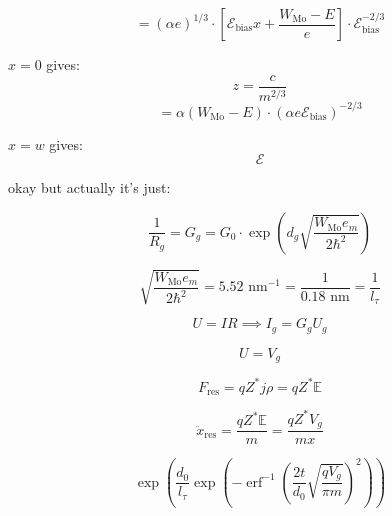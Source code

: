 \documentclass{article}
\DeclareMathOperator\erf{erf}
\begin{document}
\[=\left(\alpha e\right)^{1/3}\cdot\left[\mathcal{E}_{\text{bias}}x+\frac{W_{\text{Mo}}-E}{e}\right]
\cdot\mathcal{E}_{\text{bias}}^{-2/3}\]

$x=0$ gives:
\[z=\frac{c}{m^{2/3}}\]
\[=\alpha(W_{\text{Mo}}-E)\cdot\left(\alpha e\mathcal{E}_{\text{bias}}\right)^{-2/3}\]

$x=w$ gives:
\[\mathcal{E}\]

okay but actually it's just:




\[
\frac{1}{R_g} = G_g = G_0 \cdot \exp \left(d_g\sqrt{\frac{W_{\text{Mo}} e_m}{2\hbar^2}} \right)
\]

\[
\sqrt{\frac{W_{\text{Mo}} e_m}{2\hbar^2}} = 5.52\text{ nm}^{-1} = \frac{1}{0.18 \text{ nm} } = \frac{1}{l_\tau}
\]

\[
U=IR\implies I_g=G_gU_g
\]

\[
U=V_g
\]

\[
F_\text{res}=qZ^*j\rho=qZ^*\mathbb{E}
\]

\[
\ddot{x}_\text{res}=\frac{qZ^*\mathbb{E}}{m}=\frac{qZ^*V_g}{mx}
\]

\[
\exp\left(\frac{d_0}{l_\tau}\exp\left(-\erf^{-1}\left(
\frac{2t}{d_0}\sqrt{\frac{qV_g}{\pi m}}
\right)^2\right)\right)
\]
\end{document}

